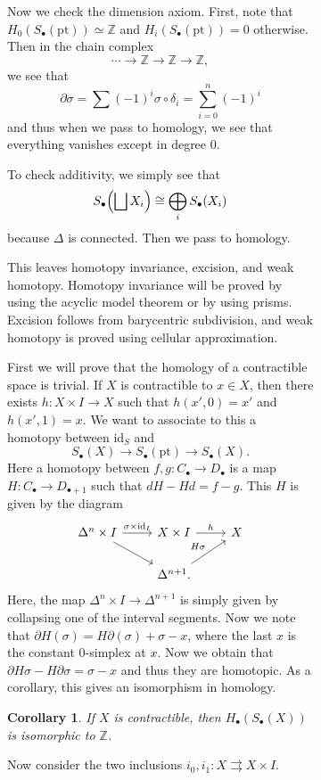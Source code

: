 \documentclass[leqno, openany]{memoir}
\newtheorem{cor}[thm]{Corollary}
\theoremstyle{definition}
\theoremstyle{remark}
\theoremstyle{plain}
\theoremstyle{definition}
\theoremstyle{remark}
\newcommand{\Z}{\mathbb{Z}}
\newcommand{\mr}[1]{\mathrm{#1}}
\begin{document}
\begin{figure}[H]
\begin{figure}[H]
Now we check the dimension axiom. First, note that $H_0(S_{\bullet}(\mr{pt}))
\simeq \Z$ and $H_i(S_{\bullet}(\mr{pt})) = 0$ otherwise. Then in the chain
complex \[ \cdots \to \Z \to \Z \to \Z, \] we see that \[ \partial \sigma =
\sum (-1)^i \sigma \circ \delta_i = \sum_{i=0}^n (-1)^i \] and thus when we
pass to homology, we see that everything vanishes except in degree $0$.

To check additivity, we simply see that \[ S_{\bullet}\qty(\bigsqcup X_i) \cong
\bigoplus_i S_{\bullet} (X_i) \] because $\Delta$ is connected. Then we pass to
homology. 

This leaves homotopy invariance, excision, and weak homotopy. Homotopy
invariance will be proved by using the acyclic model theorem or by using
prisms. Excision follows from barycentric subdivision, and weak homotopy is
proved using cellular approximation.

First we will prove that the homology of a contractible space is trivial. If
$X$ is contractible to $x \in X$, then there exists $h \colon X \times I \to X$
such that $h(x', 0) = x'$ and $h(x',1) = x$. We want to associate to this a
homotopy between $\mr{id}_S$ and \[ S_{\bullet}(X) \to S_{\bullet}(\mr{pt}) \to
S_{\bullet}(X). \] Here a homotopy between $f,g \colon C_{\bullet} \to
D_{\bullet}$ is a map $H \colon C_{\bullet} \to D_{\bullet + 1}$ such that $dH
- Hd = f-g$.  This $H$ is given by the diagram \begin{equation*} \begin{tikzcd}
    \Delta^n \times I \arrow{r}{\sigma \times \mr{id}_I} \arrow{dr} & X \times
    I \arrow{r}{h} & X \\ & \Delta^{n+1} \arrow{ur}{H\sigma}.  \end{tikzcd}
\end{equation*} Here, the map $\Delta^n \times I \to \Delta^{n+1}$ is simply
given by collapsing one of the interval segments. Now we note that $\partial
H(\sigma) = H \partial(\sigma) + \sigma - x$, where the last $x$ is the
constant $0$-simplex at $x$. Now we obtain that $\partial H \sigma - H \partial
\sigma = \sigma - x$ and thus they are homotopic. As a corollary, this gives an
isomorphism in homology.

\begin{cor} If $X$ is contractible, then $H_{\bullet}(S_{\bullet}(X))$ is
isomorphic to $\Z$.  \end{cor}

Now consider the two inclusions $i_0, i_1 \colon X \rightrightarrows X \times
I$.


\end{figure}
\end{figure}
\end{document}
